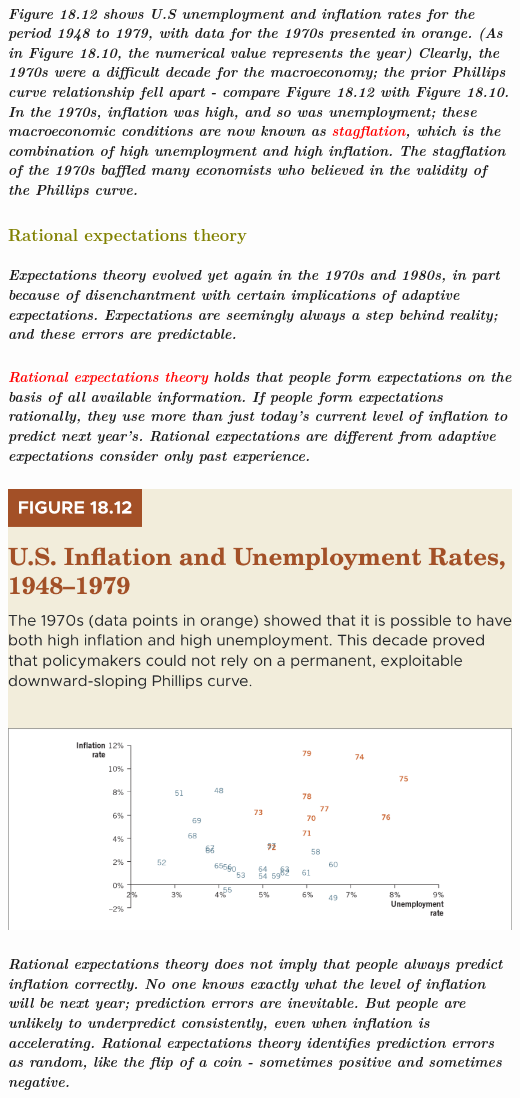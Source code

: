 \documentclass[11pt]{article} %
\begin{document}
\subparagraph*{Figure 18.12 shows U.S unemployment and inflation rates for the period 1948 to 1979, with data for the 1970s presented in orange. (As in Figure 18.10, the numerical value represents the year) Clearly, the 1970s were a difficult decade for the macroeconomy; the prior Phillips curve relationship fell apart - compare Figure 18.12 with Figure 18.10. In the 1970s, inflation was high, and so was unemployment; these macroeconomic conditions are now known as \textbf{\textcolor{red}{stagflation}}, which is the combination of high unemployment and high inflation. The stagflation of the 1970s baffled many economists who believed in the validity of the Phillips curve.}

\subsubsection*{\textcolor{olive}{Rational expectations theory}}
\subparagraph*{
Expectations theory evolved yet again in the 1970s and 1980s, in part because of disenchantment with certain implications of adaptive expectations. Expectations are seemingly always a step behind reality; and these errors are predictable. 
}
\subparagraph*{\textbf{\textcolor{red}{Rational expectations theory}} holds that people form expectations on the basis of all available information. If people form expectations rationally, they use more than just today's current level of inflation to predict next year's. Rational expectations are different from adaptive expectations consider only past experience.}
\begin{center}
\includegraphics[scale=0.5]{images/Figure 18.12.png} 
\end{center}
\subparagraph*{Rational expectations theory does not imply that people always predict inflation correctly. No one knows exactly what the level of inflation will be next year; prediction errors are inevitable. But people are unlikely to underpredict consistently, even when inflation is accelerating. Rational expectations theory identifies prediction errors as random, like the flip of a coin - sometimes positive and sometimes negative.}
\end{document}
